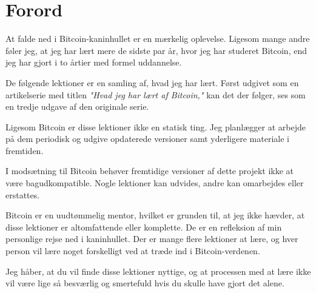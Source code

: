 \chapter*{Forord}

At falde ned i Bitcoin-kaninhullet er en mærkelig oplevelse. Ligesom mange andre
føler jeg, at jeg har lært mere de sidste par år, hvor jeg har studeret Bitcoin,
end jeg har gjort i to årtier med formel uddannelse.

De følgende lektioner er en samling af, hvad jeg har lært. Først udgivet
som en artikelserie med titlen \textit{"Hvad jeg har lært af Bitcoin,"} kan det
der følger, ses som en tredje udgave af den originale serie.

Ligesom Bitcoin er disse lektioner ikke en statisk ting. Jeg planlægger at 
arbejde på dem periodisk og udgive opdaterede versioner samt yderligere 
materiale i fremtiden.

I modsætning til Bitcoin behøver fremtidige versioner af dette projekt ikke at
være bagudkompatible. Nogle lektioner kan udvides, andre kan omarbejdes eller
erstattes.

Bitcoin er en uudtømmelig mentor, hvilket er grunden til, at jeg ikke hævder, at
disse lektioner er altomfattende eller komplette. De er en refleksion af min
personlige rejse ned i kaninhullet. Der er mange flere lektioner at lære, og
hver person vil lære noget forskelligt ved at træde ind i Bitcoin-verdenen.

Jeg håber, at du vil finde disse lektioner nyttige, og at processen med at lære
ikke vil være lige så besværlig og smertefuld hvis du skulle have gjort det 
alene.

%
%
